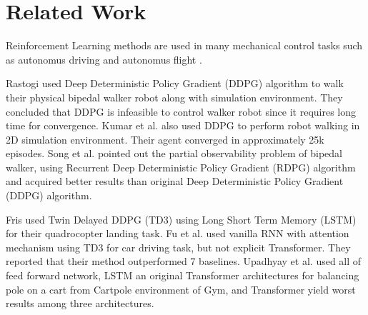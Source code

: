 \section{Related Work}
\label{sec:relatedwork}

Reinforcement Learning methods are used in many mechanical control tasks such as autonomus driving  \cite{pan_virtual_2017} \cite{shalev-shwartz_safe_2016} \cite{sallab_deep_2017} \cite{wang_deep_2019} and autonomus flight   \cite{kopsa_reinforcement_2018} \cite{abbeel_application_2006} \cite{santos_experimental_2012}.

Rastogi \cite{rastogi_deep_2017} used Deep Deterministic Policy Gradient (DDPG) algorithm to walk their physical bipedal walker robot along with simulation environment. They concluded that DDPG is infeasible to control walker robot since it requires long time for convergence. Kumar et al. \cite{kumar_bipedal_2018} also used DDPG to perform robot walking in 2D simulation environment. Their agent converged in approximately 25k episodes. Song et al. \cite{song_recurrent_2018} pointed out the partial observability problem of bipedal walker, using Recurrent Deep Deterministic Policy Gradient (RDPG) \cite{heess_memory-based_2015} algorithm and acquired better results than original Deep Deterministic Policy Gradient (DDPG) algorithm. 

Fris \cite{fris_landing_2020} used Twin Delayed DDPG (TD3) using Long Short Term Memory (LSTM) for their quadrocopter landing task. Fu et al. \cite{fu_when_2020} used vanilla RNN with attention mechanism using TD3 for car driving task, but not explicit Transformer. They reported that their method outperformed 7 baselines. Upadhyay et al. \cite{upadhyay_transformer_2019} used all of feed forward network, LSTM an original Transformer architectures for balancing pole on a cart from Cartpole environment of Gym, and Transformer yield worst results among three architectures.